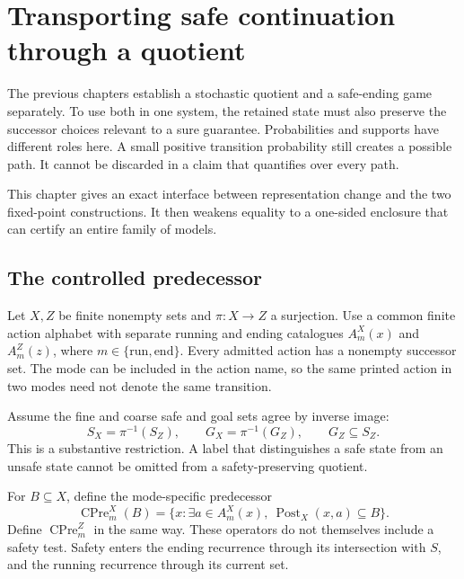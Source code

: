 \chapter{Transporting safe continuation through a quotient}\label{ch:controltransport}

The previous chapters establish a stochastic quotient and a safe-ending game separately. To use both in one system, the retained state must also preserve the successor choices relevant to a sure guarantee. Probabilities and supports have different roles here. A small positive transition probability still creates a possible path. It cannot be discarded in a claim that quantifies over every path.

This chapter gives an exact interface between representation change and the two fixed-point constructions. It then weakens equality to a one-sided enclosure that can certify an entire family of models.

\section{The controlled predecessor}
Let $X,Z$ be finite nonempty sets and $\pi:X\to Z$ a surjection. Use a common finite action alphabet with separate running and ending catalogues $A^X_m(x)$ and $A^Z_m(z)$, where $m\in\{\mathrm{run},\mathrm{end}\}$. Every admitted action has a nonempty successor set. The mode can be included in the action name, so the same printed action in two modes need not denote the same transition.

Assume the fine and coarse safe and goal sets agree by inverse image:
\[
 S_X=\pi^{-1}(S_Z),\qquad G_X=\pi^{-1}(G_Z),\qquad G_Z\subseteq S_Z.
\]
This is a substantive restriction. A label that distinguishes a safe state from an unsafe state cannot be omitted from a safety-preserving quotient.

For $B\subseteq X$, define the mode-specific predecessor
\[
 \operatorname{CPre}^X_m(B)
 =\{x:\exists a\in A^X_m(x),\ \operatorname{Post}_X(x,a)\subseteq B\}.
\]
Define $\operatorname{CPre}^Z_m$ in the same way. These operators do not themselves include a safety test. Safety enters the ending recurrence through its intersection with $S$, and the running recurrence through its current set.

